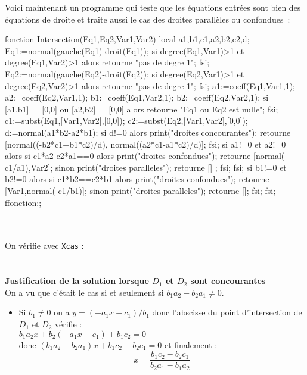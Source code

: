 \documentclass[12pt,a4paper]{book}
\begin{document}
\begin{giacjshere}
Voici maintenant un programme qui teste que les \'equations
entr\'ees sont bien des \'equations de droite et traite aussi 
le cas des droites parall\`eles ou confondues~:
\begin{giacprog}
fonction Intersection(Eq1,Eq2,Var1,Var2)
 local a1,b1,c1,a2,b2,c2,d;
 Eq1:=normal(gauche(Eq1)-droit(Eq1));
 si degree(Eq1,Var1)>1 et degree(Eq1,Var2)>1  alors 
   retourne "pas de degre 1"; 
 fsi;
 Eq2:=normal(gauche(Eq2)-droit(Eq2));
 si degree(Eq2,Var1)>1 et degree(Eq2,Var2)>1 alors 
   retourne "pas de degre 1"; 
 fsi;
 a1:=coeff(Eq1,Var1,1);
 a2:=coeff(Eq2,Var1,1);
 b1:=coeff(Eq1,Var2,1);
 b2:=coeff(Eq2,Var2,1);
 si [a1,b1]==[0,0] ou [a2,b2]==[0,0] alors 
   retourne "Eq1 ou Eq2 est nulle"; 
 fsi;
 c1:=subst(Eq1,[Var1,Var2],[0,0]);
 c2:=subst(Eq2,[Var1,Var2],[0,0]);
 d:=normal(a1*b2-a2*b1);
 si d!=0 alors 
   print("droites concourantes");
   retourne [normal((-b2*c1+b1*c2)/d),
             normal((a2*c1-a1*c2)/d)];
 fsi;
 si a1!=0 et a2!=0 alors 
   si c1*a2-c2*a1==0 alors 
     print("droites confondues");
     retourne [normal(-c1/a1),Var2]; 
   sinon 
     print("droites paralleles");
     retourne [] ;
   fsi;
 fsi;    
 si b1!=0 et b2!=0 alors 
   si c1*b2==c2*b1 alors 
     print("droites confondues");
     retourne [Var1,normal(-c1/b1)]; 
   sinon 
     print("droites paralleles");
     retourne [];
   fsi;
 fsi;
ffonction:;
\end{giacprog}
\\
\\
On v\'erifie avec {\tt Xcas} :\\
\\
\\
{\bf Justification de la solution lorsque $D_1$ et $D_2$ sont concourantes}\\
On a vu que c'\'etait le cas si et seulement si
$ b_1a_2-b_2a_1\neq0$.
\begin{itemize}
\item Si $ b_1\neq0$ on a $ y=(-a_1x-c_1)/b_1$ donc l'abscisse du point 
d'intersection de $D_1$ et $D_2$ v\'erifie :\\
$ b_1a_2x+b_2(-a_1x-c_1)+b_1c_2=0$\\
donc $ (b_1a_2-b_2a_1)x+b_1c_2-b_2c_1=0$ et finalement :
$$x=\frac{b_1c_2-b_2c_1}{b_2a_1-b_1a_2} $$

\end{itemize}
\end{giacjshere}
\end{document}
